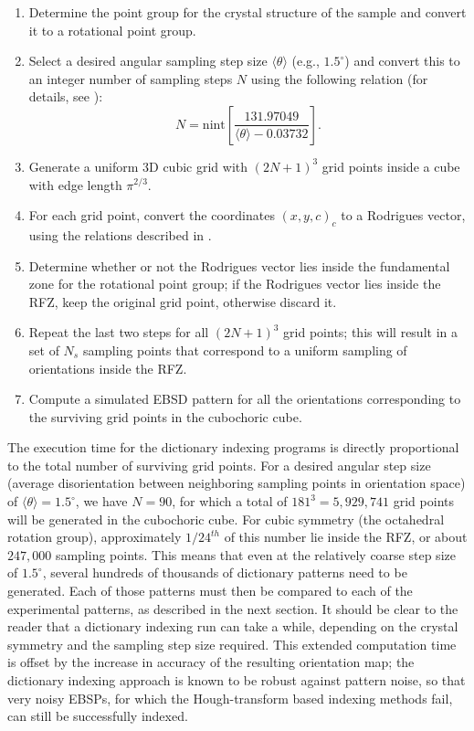 \documentclass[DIV=calc, paper=letter, fontsize=11pt]{scrartcl}	 %
\begin{document}
\begin{enumerate}
\item Determine the point group for the crystal structure of the sample and convert it to a rotational point group.
\item Select a desired angular sampling step size $\langle\theta\rangle$ (e.g., $1.5^{\circ}$) and convert this to an integer number of sampling steps $N$ using the following 
relation (for details, see \cite{degraef2016p}):
\begin{equation}
    N = \mathrm{nint}\left[\frac{131.97049}{\langle\theta\rangle-0.03732}\right].
\end{equation}
\item Generate a uniform 3D cubic grid with $(2N+1)^3$ grid points inside a cube with edge length $\pi^{2/3}$.
\item For each grid point, convert the coordinates $(x,y,c)_c$ to a Rodrigues vector, using the relations described in \cite{degraef2015t}.
\item Determine whether or not the Rodrigues vector lies inside the fundamental zone
for the rotational point group; if the Rodrigues vector lies inside the RFZ, keep the original grid point, otherwise discard it.
\item Repeat the last two steps for all $(2N+1)^3$ grid points; this will result in a set of $N_s$ sampling points that correspond to a uniform sampling of orientations inside the RFZ.
\item Compute a simulated EBSD pattern for all the orientations corresponding to the surviving grid points in the cubochoric cube.
\end{enumerate}
The execution time for the dictionary indexing programs is directly proportional to the total number of surviving grid points.  For a desired 
angular step size (average disorientation between neighboring sampling points in orientation space) of $\langle\theta\rangle=1.5^{\circ}$,
we have $N=90$, for which a total of $181^3=5,929,741$ grid points will be generated in the cubochoric cube.  For cubic symmetry (the 
octahedral rotation group), approximately $1/24^{th}$ of this number lie inside the RFZ, or about $247,000$ sampling points.  This means 
that even at the relatively coarse step size of $1.5^{\circ}$, several hundreds of thousands of dictionary patterns need to be generated.
Each of those patterns must then be compared to each of the experimental patterns, as described in the next section.  It should be 
clear to the reader that a dictionary indexing run can take a while, depending on the crystal symmetry and the sampling step size required.
This extended computation time is offset by the increase in accuracy of the resulting orientation map; the dictionary indexing approach is known
to be robust against pattern noise, so that very noisy EBSPs, for which the Hough-transform based indexing methods fail, can still be successfully
indexed.
\end{document}
